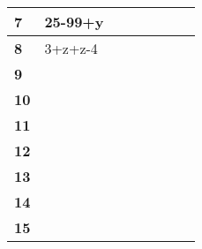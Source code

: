 \documentclass[12pt]{article}
\begin{document}
{\begin{tabular}{|
>{}C{0.8cm} |C{2.2cm}|C{2.2cm}|C{2.2cm}|C{2.2cm}|C{2.2cm}|C{2.2cm}|C{2.2cm}|}
\textbf{7}  & 25-99+y                            &                                    &                                    &                                    &                                    &                                    &                                    \\ \hline
\textbf{8}  & 3+z+z-4                            &                                    &                                    &                                    &                                    &                                    &                                    \\ \hline
\textbf{9}  &                                    &                                    &                                    &                                    &                                    &                                    &                                    \\ \hline
\textbf{10} &                                    &                                    &                                    &                                    &                                    &                                    &                                    \\ \hline
\textbf{11} &                                    &                                    &                                    &                                    &                                    &                                    &                                    \\ \hline
\textbf{12} &                                    &                                    &                                    &                                    &                                    &                                    &                                    \\ \hline
\textbf{13} &                                    &                                    &                                    &                                    &                                    &                                    &                                    \\ \hline
\textbf{14} &                                    &                                    &                                    &                                    &                                    &                                    &                                    \\ \hline
\textbf{15} &                                    &                                    &                                    &                                    &                                    &                                    &                                    \\ \hline

\end{tabular}}
\end{document}
